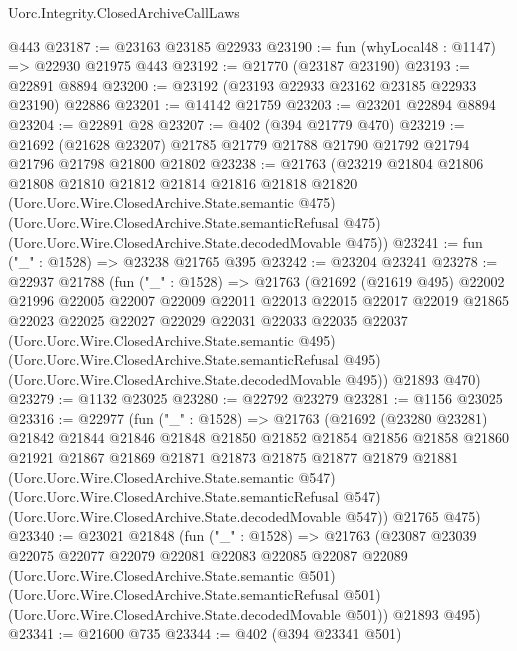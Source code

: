 \begin{lexlean}{Uorc.Integrity.ClosedArchiveCallLaws}
\begin{coremodule}
    @443
@23187 := @23163 @23185 @22933
@23190 := fun (whyLocal48 : @1147) => @22930 @21975 @443
@23192 := @21770 (@23187 @23190)
@23193 := @22891 @8894
@23200 := @23192 (@23193 @22933 @23162 @23185 @22933 @23190) @22886
@23201 := @14142 @21759
@23203 := @23201 @22894 @8894
@23204 := @22891 @28
@23207 := @402 (@394 @21779 @470)
@23219 := @21692
    (@21628 @23207)
    @21785
    @21779
    @21788
    @21790
    @21792
    @21794
    @21796
    @21798
    @21800
    @21802
@23238 := @21763
    (@23219
      @21804
      @21806
      @21808
      @21810
      @21812
      @21814
      @21816
      @21818
      @21820
      (Uorc.Uorc.Wire.ClosedArchive.State.semantic @475)
      (Uorc.Uorc.Wire.ClosedArchive.State.semanticRefusal @475)
      (Uorc.Uorc.Wire.ClosedArchive.State.decodedMovable @475))
@23241 := fun ("_" : @1528) => @23238 @21765 @395
@23242 := @23204 @23241
@23278 := @22937
    @21788
    (fun ("_" : @1528) =>
    @21763
      (@21692
        (@21619 @495)
        @22002
        @21996
        @22005
        @22007
        @22009
        @22011
        @22013
        @22015
        @22017
        @22019
        @21865
        @22023
        @22025
        @22027
        @22029
        @22031
        @22033
        @22035
        @22037
        (Uorc.Uorc.Wire.ClosedArchive.State.semantic @495)
        (Uorc.Uorc.Wire.ClosedArchive.State.semanticRefusal @495)
        (Uorc.Uorc.Wire.ClosedArchive.State.decodedMovable @495))
      @21893
      @470)
@23279 := @1132 @23025
@23280 := @22792 @23279
@23281 := @1156 @23025
@23316 := @22977
    (fun ("_" : @1528) =>
    @21763
      (@21692
        (@23280 @23281)
        @21842
        @21844
        @21846
        @21848
        @21850
        @21852
        @21854
        @21856
        @21858
        @21860
        @21921
        @21867
        @21869
        @21871
        @21873
        @21875
        @21877
        @21879
        @21881
        (Uorc.Uorc.Wire.ClosedArchive.State.semantic @547)
        (Uorc.Uorc.Wire.ClosedArchive.State.semanticRefusal @547)
        (Uorc.Uorc.Wire.ClosedArchive.State.decodedMovable @547))
      @21765
      @475)
@23340 := @23021
    @21848
    (fun ("_" : @1528) =>
    @21763
      (@23087
        @23039
        @22075
        @22077
        @22079
        @22081
        @22083
        @22085
        @22087
        @22089
        (Uorc.Uorc.Wire.ClosedArchive.State.semantic @501)
        (Uorc.Uorc.Wire.ClosedArchive.State.semanticRefusal @501)
        (Uorc.Uorc.Wire.ClosedArchive.State.decodedMovable @501))
      @21893
      @495)
@23341 := @21600 @735
@23344 := @402 (@394 @23341 @501)

\end{coremodule}
\end{lexlean}

